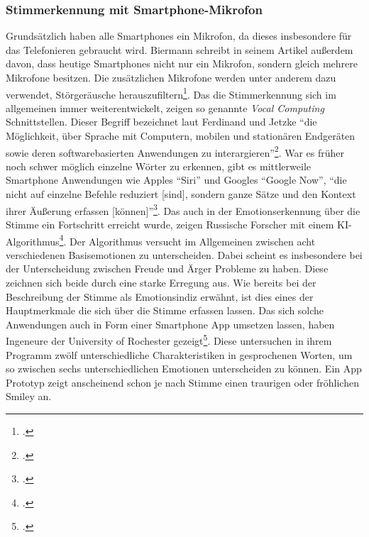 \subsubsection{Stimmerkennung mit Smartphone-Mikrofon}
Grundsätzlich haben alle Smartphones ein Mikrofon, da dieses insbesondere für das Telefonieren gebraucht wird. Biermann schreibt in seinem Artikel außerdem davon, dass heutige Smartphones nicht nur ein Mikrofon, sondern gleich mehrere Mikrofone besitzen. Die zusätzlichen Mikrofone werden unter anderem dazu verwendet, Störgeräusche herauszufiltern\footcite[Vgl. ][S.2 Mikrofon Abs.2]{Bie14}.\newline
Das die Stimmerkennung sich im allgemeinen immer weiterentwickelt, zeigen so genannte \textit{Vocal Computing} Schnittstellen. Dieser Begriff bezeichnet laut Ferdinand und Jetzke ``die Möglichkeit, über Sprache mit Computern, mobilen und stationären Endgeräten sowie deren softwarebasierten Anwendungen zu interargieren''\footcite[siehe ][S.1 Z.1ff]{Fer17}. War es früher noch schwer möglich einzelne Wörter zu erkennen, gibt es mittlerweile Smartphone Anwendungen wie Apples ``Siri'' und Googles ``Google Now'', ``die nicht auf einzelne Befehle reduziert [sind], sondern ganze Sätze und den Kontext ihrer Äußerung erfassen [können]''\footcite[siehe ][S.1 Z.17ff]{Fer17}.\newline
Das auch in der Emotionserkennung über die Stimme ein Fortschritt erreicht wurde, zeigen Russische Forscher mit einem KI-Algorithmus\footcite[Vgl. ][]{Sta17}. Der Algorithmus versucht im Allgemeinen zwischen acht verschiedenen Basisemotionen zu unterscheiden. Dabei scheint es insbesondere bei der Unterscheidung zwischen Freude und Ärger Probleme zu haben. Diese zeichnen sich beide durch eine starke Erregung aus. Wie bereits bei der Beschreibung der Stimme als Emotionsindiz erwähnt, ist dies eines der Hauptmerkmale die sich über die Stimme erfassen lassen.\newline
Das sich solche Anwendungen auch in Form einer Smartphone App umsetzen lassen, haben Ingeneure der University of Rochester gezeigt\footcite[Vgl. ][]{Wed12}. Diese untersuchen in ihrem Programm zwölf unterschiedliche Charakteristiken in gesprochenen Worten, um so zwischen sechs unterschiedlichen Emotionen unterscheiden zu können. Ein App Prototyp zeigt anscheinend schon je nach Stimme einen traurigen oder fröhlichen Smiley an.
